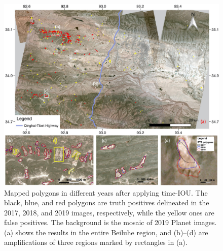 \documentclass[authoryear,preprint,review,12pt]{elsarticle}
\begin{document}
\begin{figure} 
	\centering
	\includegraphics[width=14cm]{figs/multi_mapping_results_trim.jpg}
	\caption{Mapped polygons in different years after applying time-IOU. The black, blue, and red polygons are truth positives delineated in the 2017, 2018, and 2019 images, respectively, while the yellow ones are false  positives. The background is the mosaic of 2019 Planet images. (a) shows the results in the entire Beiluhe region, and (b)--(d) are amplifications of three regions marked by rectangles in (a). }
	\label{fig_mapping_results}
\end{figure}
\end{document}
